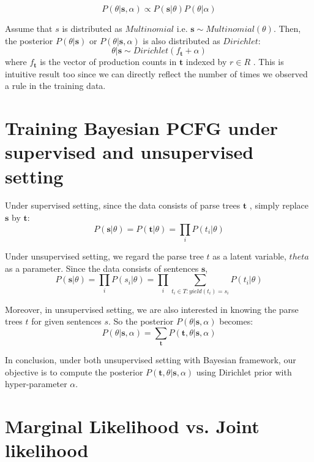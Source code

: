 \documentclass[11pt]{article}
\begin{document}
$$
P(\theta|\boldsymbol{s}, \alpha) \propto P(\boldsymbol{s}|\theta) P(\theta | \alpha)
$$


Assume that $s$ is distributed as $Multinomial$ i.e. $\boldsymbol{s} \sim Multinomial(\theta)$. Then, the posterior $P(\theta|\boldsymbol{s})$ or $P(\theta|\boldsymbol{s}, \alpha)$ is also distributed as $Dirichlet$:
$$
\theta|\boldsymbol{s} \sim Dirichlet(f_{\boldsymbol{t}} + \alpha)
$$
where $f_{\boldsymbol{t}}$ is the vector of production counts in $\boldsymbol{t}$ indexed by $r \in R$ \cite{johnson-griffiths-goldwater:2007:main}. This is intuitive result too since we can directly reflect the number of times we observed a rule in the training data.

\section{Training Bayesian PCFG under supervised and unsupervised setting}

Under supervised setting, since the data consists of parse trees $\boldsymbol{t}$ \cite{cohen-johnson:2013:ACL2013}, simply replace $\boldsymbol{s}$ by $\boldsymbol{t}$:
$$
P(\boldsymbol{s}|\theta) =  P(\boldsymbol{t}|\theta) = \prod_i P(t_i | \theta)
$$

Under unsupervised setting, we regard the parse tree $t$ as a latent variable, $theta$ as a parameter. Since the data consists of sentences $\boldsymbol{s}$,
$$
P(\boldsymbol{s}|\theta) = \prod_i P(s_i | \theta) = \prod_i \sum_{t_i \in T: yield(t_i) = s_i} P(t_i | \theta)
$$




Moreover, in unsupervised setting, we are also interested in knowing the parse trees $t$ for given sentences $s$. So the posterior $P(\theta|\boldsymbol{s}, \alpha)$ becomes:
$$
P(\theta|\boldsymbol{s}, \alpha) = \sum_{\boldsymbol{t}} P(\boldsymbol{t}, \theta | \boldsymbol{s}, \alpha) 
$$

In conclusion, under both unsupervised setting with Bayesian framework, our objective is to compute the posterior $P(\boldsymbol{t}, \theta | \boldsymbol{s}, \alpha)$ using Dirichlet prior with hyper-parameter $\alpha$.

\section{Marginal Likelihood vs. Joint likelihood}
\end{document}
